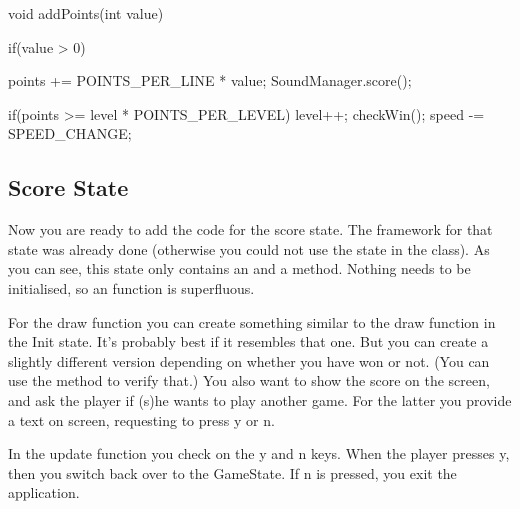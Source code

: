 \begin{code}
void addPoints(int value)
{
  if(value > 0)
  {
    points += POINTS_PER_LINE * value;
    SoundManager.score();
 
    if(points >= level * POINTS_PER_LEVEL)
    {
      level++;
      checkWin();
      speed -= SPEED_CHANGE;
    } 
  }      
}
\end{code}

\subsection{Score State}
Now you are ready to add the code for the score state. The framework for that state was already done (otherwise you could not use the state in the  class). As you can see, this state only contains an  and a  method. Nothing needs to be initialised, so an  function is superfluous.

For the draw function you can create something similar to the draw function in the Init state. It's probably best if it resembles that one. But you can create a slightly different version depending on whether you have won or not. (You can use the method  to verify that.) You also want to show the score on the screen, and ask the player if (s)he wants to play another game. For the latter you provide a text on screen, requesting to press y or n.

In the update function you check on the y and n keys. When the player presses y, then you switch back over to the GameState. If n is pressed, you exit the application.